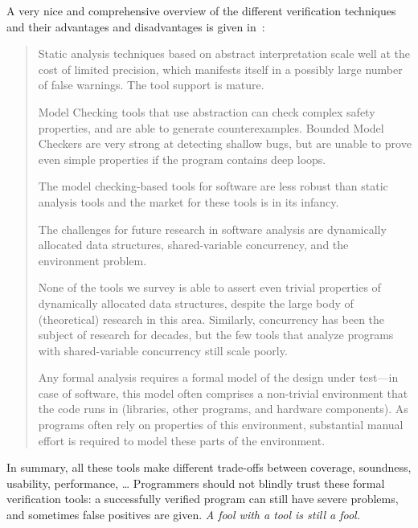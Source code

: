 A very nice and comprehensive overview of the different verification techniques and their advantages and disadvantages is given in~\cite{dkw2008}:
\begin{quote}
\small{
Static analysis techniques based on abstract interpretation
scale well at the cost of limited precision, which manifests
itself in a possibly large number of false warnings. The tool
support is mature. 

Model Checking tools that use abstraction
can check complex safety properties, and are able to generate
counterexamples. Bounded Model Checkers are very strong at
detecting shallow bugs, but are unable to prove even simple
properties if the program contains deep loops. 

The model checking-based tools for software are less robust than static
analysis tools and the market for these tools is in its infancy.

The challenges for future research in software analysis are dynamically allocated data structures,
shared-variable concurrency, and the environment problem.

None of the tools we survey is able to assert even trivial
properties of dynamically allocated data structures, despite the
large body of (theoretical) research in this area. Similarly,
concurrency has been the subject of research for decades,
but the few tools that analyze programs with shared-variable
concurrency still scale poorly. 

Any formal analysis requires a
formal model of the design under test---in case of software,
this model often comprises a non-trivial environment that
the code runs in (libraries, other programs, and hardware
components). As programs often rely on properties of this
environment, substantial manual effort is required to model
these parts of the environment.}
\end{quote}

In summary, all these tools make different trade-offs between coverage, soundness, usability, performance, \ldots
Programmers should not blindly trust these formal verification tools: a successfully verified program can still have severe problems, and sometimes false positives are given. \emph{A fool with a tool is still a fool.} 





